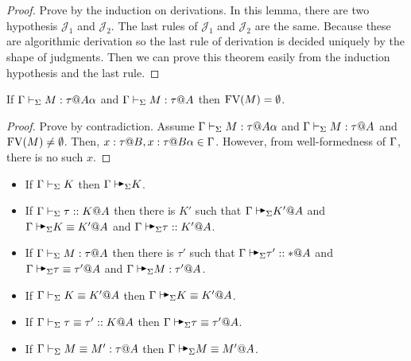 \begin{proof}
    Prove by the induction on derivations.  In this lemma, there are two
    hypothesis \( \mathcal{J}_1 \) and \( \mathcal{J}_2 \).  The last rules of
    \( \mathcal{J}_1 \) and \( \mathcal{J}_2 \) are the same.  Because these
    are algorithmic derivation so the last rule of derivation is decided
    uniquely by the shape of judgments.  Then we can prove this theorem easily
    from the induction hypothesis and the last rule.
\end{proof}

\begin{lemma}
    \label{lemma:FreeVariableandStage}
    If \( \G\V M:\tau@{A\alpha} \) and \( \Gamma\vdash_\Sigma M:\tau @A \) then \( \text{FV}(M) = \emptyset \).
\end{lemma}

\begin{proof}
    Prove by contradiction. Assume \( \G\V M:\tau@{A\alpha} \) and \( \Gamma\vdash_\Sigma
    M:\tau @A \) and \( \text{FV}(M) \neq \emptyset \). Then, \( x : \tau @ B, x:
    \tau @ B\alpha \in \Gamma \). However, from well-formedness of \( \Gamma \), there
    is no such \( x \).
\end{proof}

\begin{theorem}
    \label{theorem:CompletenessofAlgorithmicTyping}
    \begin{itemize}
        \item If \(\Gamma\vdash_\Sigma K \) then \(\G\AVS K \).
        \item If \(\Gamma\vdash_\Sigma \tau ::K @ A \) then there is \(K'\) such that \( \G \AVS K' @ A \) and \( \G \AVS K\E K' @ A \) and \( \G\AVS \tau :: K' @ A \).
        \item If \(\Gamma\vdash_\Sigma M:\tau @ A \) then there is \(\tau'\) such that \( \G \AVS \tau' :: * @ A \) and \( \G \AVS \tau \E \tau' @ A \) and \( \G\AVS M:\tau' @ A \).
        \item If \(\Gamma\vdash_\Sigma K\equiv K' @ A \) then \(\G\AVS K\E K' @ A \).
        \item If \(\Gamma\vdash_\Sigma \tau \equiv \tau' :: K @ A \) then \(\G\AVS \tau \E \tau' @ A \).
        \item If \(\Gamma\vdash_\Sigma M\equiv M' : \tau @ A \) then \(\G \AVS M \E M' @ A \).
    \end{itemize}
\end{theorem}

